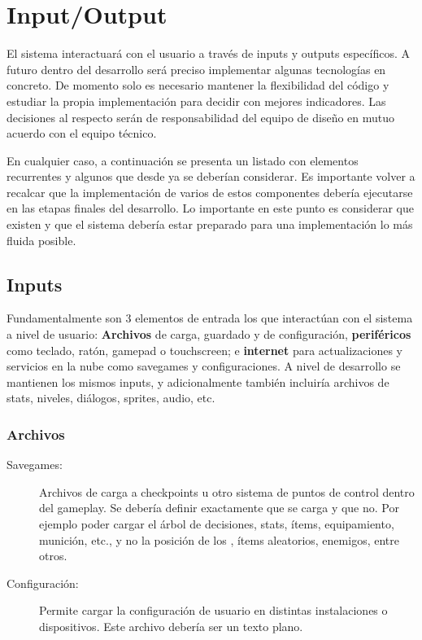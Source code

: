 
\section{Input/Output}\label{io:input-output}

El sistema interactuará con el usuario a través de inputs y outputs específicos. A futuro dentro del desarrollo será preciso implementar algunas tecnologías en concreto. De momento solo es necesario mantener la flexibilidad del código y estudiar la propia implementación para decidir con mejores indicadores. Las decisiones al respecto serán de responsabilidad del equipo de diseño en mutuo acuerdo con el equipo técnico.

En cualquier caso, a continuación se presenta un listado con elementos recurrentes y algunos que desde ya se deberían considerar. Es importante volver a recalcar que la implementación de varios de estos componentes debería ejecutarse en las etapas finales del desarrollo. Lo importante en este punto es considerar que existen y que el sistema debería estar preparado para una implementación lo más fluida posible.

\subsection{Inputs}
Fundamentalmente son 3 elementos de entrada los que interactúan con el sistema a nivel de usuario: \textbf{Archivos} de carga, guardado y de configuración, \textbf{periféricos} como teclado, ratón, gamepad o touchscreen; e \textbf{internet} para actualizaciones y servicios en la nube como savegames y configuraciones. A nivel de desarrollo se mantienen los mismos inputs, y adicionalmente también incluiría archivos de stats, niveles, diálogos, sprites, audio, etc.

\subsubsection{Archivos}

\begin{description}
\item[Savegames:] Archivos de carga a checkpoints u otro sistema de puntos de control dentro del gameplay. Se debería definir exactamente que se carga y que no. Por ejemplo poder cargar el árbol de decisiones, stats, ítems, equipamiento, munición, etc., y no la posición de los , ítems aleatorios, enemigos, entre otros.

\item[Configuración:] Permite cargar la configuración de usuario en distintas instalaciones o dispositivos. Este archivo debería ser un texto plano.
\end{description}

